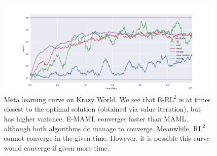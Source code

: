\documentclass{article} %
\begin{document}
\begin{figure}[h]
\begin{center}
\includegraphics[scale=0.4]{bradly_curves/64testgrid0.png} 
\end{center}
\caption{Meta learning curve on Krazy World. We see that E-$\text{RL}^2$ is at times closest to the optimal solution (obtained via value iteration), but has higher variance. E-MAML converges faster than MAML, although both algorithms do manage to converge. Meanwhile, $\text{RL}^2$ cannot converge in the given time. However, it is possible this curve would converge if given more time.}
\label{fig:learning-curves-0}
\end{figure} 
\end{document}
